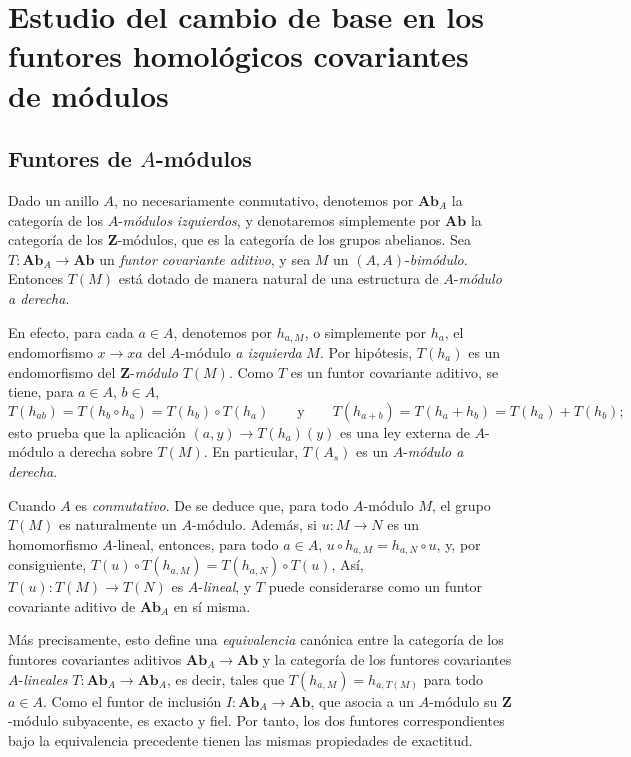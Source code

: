 \section{Estudio del cambio de base en los funtores homológicos covariantes de módulos}
\label{section:III.7}
\label{section:III.7.fr}

\subsection{Funtores de $A$-módulos}
\label{subsection:III.7.1}
\label{subsection:III.7.1.fr}

\begin{env}[7.1.1]
\label{III.7.1.1}
Dado un anillo $A$, no necesariamente conmutativo, denotemos por
$\boldsymbol{Ab}_A$ la categoría de los $A$-\emph{módulos izquierdos}, y denotaremos simplemente por $\boldsymbol{Ab}$ la categoría de los $\mathbf Z$-módulos,
que es la categoría de los grupos abelianos. Sea
$T:\boldsymbol{Ab}_A\longrightarrow\boldsymbol{Ab}$
un \emph{funtor covariante aditivo}, y sea $M$ un $(A,A)$-\emph{bimódulo}.
Entonces $T(M)$ está dotado de manera natural de una estructura de
$A$-\emph{módulo a derecha}.

En efecto, para cada $a\in A$, denotemos por $h_{a,M}$, o
simplemente por $h_a$, el endomorfismo
$x\to xa$
del $A$-módulo \emph{a izquierda} $M$. Por hipótesis, $T(h_a)$ es un
endomorfismo del $\mathbf Z$-\emph{módulo} $T(M)$. Como $T$ es un funtor covariante aditivo, se tiene, para $a\in A$, $b\in A$,
\[
  T(h_{ab})
  =
  T(h_b\circ h_a)
  =
  T(h_b)\circ T(h_a)
  \qquad\text{y}\qquad
  T(h_{a+b})
  =
  T(h_a+h_b)
  =
  T(h_a)+T(h_b);
\]
esto prueba que la aplicación $(a,y)\to T(h_a)(y)$
es una ley externa de $A$-módulo a derecha sobre
$T(M)$. En particular, $T(A_s)$ es un $A$-\emph{módulo a derecha}.
\end{env}

\begin{env}[7.1.2]
Cuando $A$ es \emph{conmutativo}. De  se deduce
que, para todo $A$-módulo $M$, el grupo $T(M)$ es naturalmente un
$A$-módulo. Además, si $u:M\to N$ es un homomorfismo
$A$-lineal, entonces, para todo $a\in A$,
$u\circ h_{a,M}=h_{a,N}\circ u$,
y, por consiguiente,
$T(u)\circ T(h_{a,M})=T(h_{a,N})\circ T(u)$,
Así, $T(u):T(M)\to T(N)$ es $A$-\emph{lineal}, y $T$ puede considerarse
como un funtor covariante aditivo de $\boldsymbol{Ab}_A$ en sí misma.

Más precisamente, esto define una \emph{equivalencia} canónica entre la
categoría de los funtores covariantes aditivos
$\boldsymbol{Ab}_A\to\boldsymbol{Ab}$
y la categoría de los funtores covariantes $A$-\emph{lineales}
$T:\boldsymbol{Ab}_A\longrightarrow\boldsymbol{Ab}_A$,
es decir, tales que
$T(h_{a,M})=h_{a,T(M)}$ para todo $a\in A$.
Como el funtor de inclusión $I:\boldsymbol{Ab}_A\longrightarrow\boldsymbol{Ab}$,
que asocia a un $A$-módulo su $\mathbf Z$-módulo subyacente, es exacto
y fiel. Por tanto, los dos funtores correspondientes bajo la
equivalencia precedente tienen las mismas propiedades de exactitud.
\end{env}


